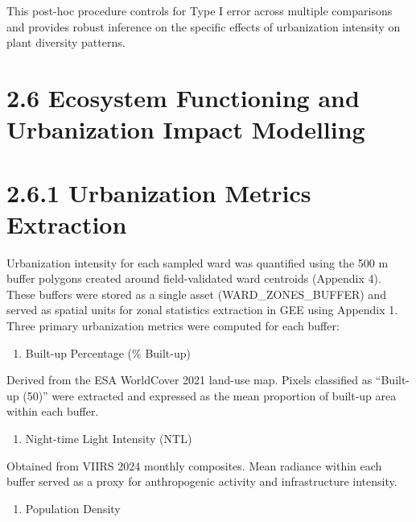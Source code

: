 This post-hoc procedure controls for Type I error across multiple comparisons and provides robust inference on the specific effects of urbanization intensity on plant diversity patterns.
\hypertarget{ecosystem-functioning-and-urbanization-impact-modelling}{%
\section{\texorpdfstring{\textbf{2.6 Ecosystem Functioning and Urbanization Impact Modelling}}{2.6 Ecosystem Functioning and Urbanization Impact Modelling}}\label{ecosystem-functioning-and-urbanization-impact-modelling}}

\hypertarget{urbanization-metrics-extraction}{%
\section{\texorpdfstring{\textbf{2.6.1 Urbanization Metrics Extraction}}{2.6.1 Urbanization Metrics Extraction}}\label{urbanization-metrics-extraction}}

Urbanization intensity for each sampled ward was quantified using the 500 m buffer polygons created around field-validated ward centroids (Appendix 4). These buffers were stored as a single asset (WARD\_ZONES\_BUFFER) and served as spatial units for zonal statistics extraction in GEE using Appendix 1. Three primary urbanization metrics were computed for each buffer:
\begin{enumerate}
\def\labelenumi{\arabic{enumi}.}
\item
Built-up Percentage (\% Built-up)
\end{enumerate}

Derived from the ESA WorldCover 2021 land-use map. Pixels classified as ``Built-up (50)'' were extracted and expressed as the mean proportion of built-up area within each buffer.
\begin{enumerate}
\def\labelenumi{\arabic{enumi}.}
\setcounter{enumi}{1}
\item
Night-time Light Intensity (NTL)
\end{enumerate}

Obtained from VIIRS 2024 monthly composites. Mean radiance within each buffer served as a proxy for anthropogenic activity and infrastructure intensity.
\begin{enumerate}
\def\labelenumi{\arabic{enumi}.}
\setcounter{enumi}{2}
\item
Population Density
\end{enumerate}

